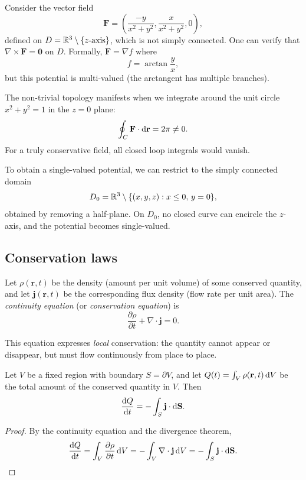 \documentclass[a4paper]{article}
\begin{document}
\begin{eg}
  Consider the vector field
  \[
    \mathbf{F} = \left(\frac{-y}{x^2 + y^2}, \frac{x}{x^2 + y^2}, 0\right),
  \]
  defined on $D = \mathbb{R}^3 \setminus \{z\text{-axis}\}$, which is not simply connected. One can verify that $\nabla\times \mathbf{F} = \mathbf{0}$ on $D$. Formally, $\mathbf{F} = \nabla f$ where
  \[
    f = \arctan\frac{y}{x},
  \]
  but this potential is multi-valued (the arctangent has multiple branches).

  The non-trivial topology manifests when we integrate around the unit circle $x^2 + y^2 = 1$ in the $z = 0$ plane:
  \[
    \oint_C \mathbf{F}\cdot \mathrm{d}\mathbf{r} = 2\pi \neq 0.
  \]
  For a truly conservative field, all closed loop integrals would vanish.

  To obtain a single-valued potential, we can restrict to the simply connected domain
  \[
    D_0 = \mathbb{R}^3 \setminus \{(x, y, z) : x \leq 0,\, y = 0\},
  \]
  obtained by removing a half-plane. On $D_0$, no closed curve can encircle the $z$-axis, and the potential becomes single-valued.
\end{eg}

\subsection{Conservation laws}
\begin{defi}
  Let $\rho(\mathbf{r}, t)$ be the density (amount per unit volume) of some conserved quantity, and let $\mathbf{j}(\mathbf{r}, t)$ be the corresponding flux density (flow rate per unit area). The \emph{continuity equation} (or \emph{conservation equation}) is
  \[
    \frac{\partial \rho}{\partial t} + \nabla\cdot \mathbf{j} = 0.
  \]
\end{defi}

This equation expresses \emph{local} conservation: the quantity cannot appear or disappear, but must flow continuously from place to place.

\begin{prop}
  Let $V$ be a fixed region with boundary $S = \partial V$, and let $Q(t) = \int_V \rho(\mathbf{r}, t)\, \mathrm{d} V$ be the total amount of the conserved quantity in $V$. Then
  \[
    \frac{\mathrm{d} Q}{\mathrm{d} t} = -\int_S \mathbf{j}\cdot \mathrm{d} \mathbf{S}.
  \]
\end{prop}

\begin{proof}
  By the continuity equation and the divergence theorem,
  \[
    \frac{\mathrm{d} Q}{\mathrm{d} t} = \int_V \frac{\partial \rho}{\partial t}\,\mathrm{d} V = -\int_V \nabla \cdot \mathbf{j}\,\mathrm{d} V = -\int_S \mathbf{j}\cdot \mathrm{d} \mathbf{S}.\qedhere
  \]
\end{proof}
\end{document}
